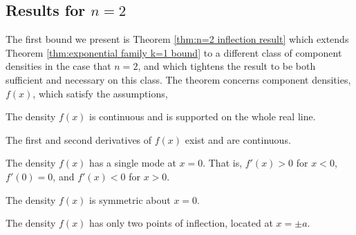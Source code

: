 		\subsection{Results for \texorpdfstring{$n = 2$}{n = 2}}
		\label{sec:results for n = 2}
		The first bound we present is Theorem \ref{thm:n=2 inflection result} which extends Theorem \ref{thm:exponential family k=1 bound} to a different class of component densities in the case that $n=2$, and which tightens the result to be both sufficient and necessary on this class. The theorem concerns component densities, $f(x)$, which satisfy the assumptions,

		\begin{assumption}[Continuity]
		\label{assump:reallinesupport}
			The density $f(x)$ is continuous and is supported on the whole real line.
		\end{assumption}

		\begin{assumption}[Differentiability]
		\label{assump:twicediff}
			The first and second derivatives of $f(x)$ exist and are continuous.
		\end{assumption}
		
		\begin{assumption}[Unimodality]
			The density $f(x)$ has a single mode at $x=0$. That is, $f'(x) > 0$ for $x <0$, $f'(0) = 0$, and $f'(x) < 0$ for $x>0$.
			\label{assump:singlemode}
		\end{assumption}
		
		\begin{assumption}[Symmetry]
			The density $f(x)$ is symmetric about $x = 0$.
			\label{assump:symmetric}
		\end{assumption}
		
		\begin{assumption}
			The density $f(x)$ has only two points of inflection, located at $x = \pm a$.
			\label{assump:twoinflectionpoints}
		\end{assumption}


			
		
